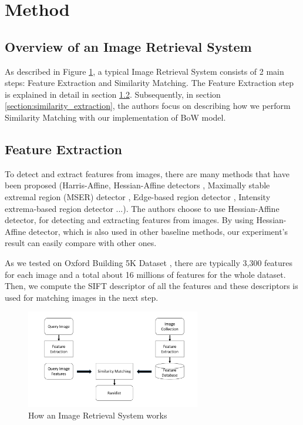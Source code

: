 % 

\section{Method} \label{section:method}
\subsection{Overview of an Image Retrieval System}

As described in Figure \ref{fig:image_retrieval_system}, a typical Image Retrieval System consists of 2 main steps: Feature Extraction and Similarity Matching. The Feature Extraction step is explained in detail in section \ref{section:feature_extraction}. Subsequently, in section \ref{section:similarity_extraction}, the authors focus on describing how we perform Similarity Matching with our implementation of BoW model.


\subsection{Feature Extraction} \label{section:feature_extraction}

To detect and extract features from images, there are many methods that have been proposed (Harris-Affine, Hessian-Affine detectors \cite{Mikolajczyk2004}, Maximally stable extremal region (MSER) detector \cite{conf/bmvc/MatasCUP02}, Edge-based region detector \cite{Tuytelaars99content-basedimage}, Intensity extrema-based region detector \cite{Tuytelaars00widebaseline} ...). The authors choose to use Hessian-Affine detector, for detecting and extracting features from images. By using Hessian-Affine detector, which is also used in other baseline methods, our experiment's result can easily compare with other ones.

As we tested on Oxford Building 5K Dataset \cite{oxbuilding}, there are typically 3,300 features for each image and a total about 16 millions of features for the whole dataset. Then, we compute the SIFT descriptor \cite{Lowe2004} of all the features and these descriptors is used for matching images in the next step.

\begin{figure}
    \centering
    \includegraphics[width=3.0in]{ImageRetrievalSystem.pdf}
    \caption{How an Image Retrieval System works}
    \label{fig:image_retrieval_system}
\end{figure}

